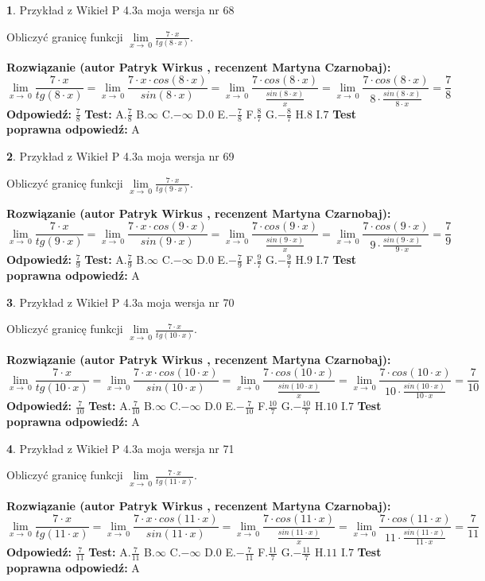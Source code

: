 \documentclass[12pt, a4paper]{article}
\theoremstyle{definition} %
\newtheorem{zad}{}
\newcommand{\zadStart}[1]{\begin{zad}#1\newline}
\newcommand{\zadStop}{\end{zad}}
\newcommand{\rozwStart}[2]{\noindent \textbf{Rozwiązanie (autor #1 , recenzent #2): }\newline}
\newcommand{\rozwStop}{\newline}
\newcommand{\odpStart}{\noindent \textbf{Odpowiedź:}\newline}
\newcommand{\odpStop}{\newline}
\newcommand{\testStart}{\noindent \textbf{Test:}\newline}
\newcommand{\testStop}{\newline}
\newcommand{\kluczStart}{\noindent \textbf{Test poprawna odpowiedź:}\newline}
\newcommand{\kluczStop}{\newline}
\begin{document}
\zadStart{Przykład z Wikieł P 4.3a moja wersja nr 68}


Obliczyć granicę funkcji $\lim\limits_{x\to\ 0}\frac{7 \cdot x}{tg(8 \cdot x)}$.
\zadStop
\rozwStart{Patryk Wirkus}{Martyna Czarnobaj}
$$\lim\limits_{x\to\ 0}\frac{7 \cdot x}{tg(8 \cdot x)}=\lim\limits_{x\to\ 0}\frac{7 \cdot x \cdot cos(8 \cdot x)}{sin(8 \cdot x)}=\lim\limits_{x\to\ 0}\frac{7 \cdot cos(8 \cdot x)}{\frac{sin(8 \cdot x)}{x}}=\lim\limits_{x\to\ 0}\frac{7 \cdot cos(8 \cdot x)}{8 \cdot \frac{sin(8 \cdot x)}{8 \cdot x}} = \frac{7}{8}$$
\rozwStop
\odpStart
$\frac{7}{8}$
\odpStop
\testStart
A.$\frac{7}{8}$
B.$\infty$
C.$-\infty$
D.$0$
E.$-\frac{7}{8}$
F.$\frac{8}{7}$
G.$-\frac{8}{7}$
H.$8$
I.$7$
\testStop
\kluczStart
A
\kluczStop



\zadStart{Przykład z Wikieł P 4.3a moja wersja nr 69}


Obliczyć granicę funkcji $\lim\limits_{x\to\ 0}\frac{7 \cdot x}{tg(9 \cdot x)}$.
\zadStop
\rozwStart{Patryk Wirkus}{Martyna Czarnobaj}
$$\lim\limits_{x\to\ 0}\frac{7 \cdot x}{tg(9 \cdot x)}=\lim\limits_{x\to\ 0}\frac{7 \cdot x \cdot cos(9 \cdot x)}{sin(9 \cdot x)}=\lim\limits_{x\to\ 0}\frac{7 \cdot cos(9 \cdot x)}{\frac{sin(9 \cdot x)}{x}}=\lim\limits_{x\to\ 0}\frac{7 \cdot cos(9 \cdot x)}{9 \cdot \frac{sin(9 \cdot x)}{9 \cdot x}} = \frac{7}{9}$$
\rozwStop
\odpStart
$\frac{7}{9}$
\odpStop
\testStart
A.$\frac{7}{9}$
B.$\infty$
C.$-\infty$
D.$0$
E.$-\frac{7}{9}$
F.$\frac{9}{7}$
G.$-\frac{9}{7}$
H.$9$
I.$7$
\testStop
\kluczStart
A
\kluczStop



\zadStart{Przykład z Wikieł P 4.3a moja wersja nr 70}


Obliczyć granicę funkcji $\lim\limits_{x\to\ 0}\frac{7 \cdot x}{tg(10 \cdot x)}$.
\zadStop
\rozwStart{Patryk Wirkus}{Martyna Czarnobaj}
$$\lim\limits_{x\to\ 0}\frac{7 \cdot x}{tg(10 \cdot x)}=\lim\limits_{x\to\ 0}\frac{7 \cdot x \cdot cos(10 \cdot x)}{sin(10 \cdot x)}=\lim\limits_{x\to\ 0}\frac{7 \cdot cos(10 \cdot x)}{\frac{sin(10 \cdot x)}{x}}=\lim\limits_{x\to\ 0}\frac{7 \cdot cos(10 \cdot x)}{10 \cdot \frac{sin(10 \cdot x)}{10 \cdot x}} = \frac{7}{10}$$
\rozwStop
\odpStart
$\frac{7}{10}$
\odpStop
\testStart
A.$\frac{7}{10}$
B.$\infty$
C.$-\infty$
D.$0$
E.$-\frac{7}{10}$
F.$\frac{10}{7}$
G.$-\frac{10}{7}$
H.$10$
I.$7$
\testStop
\kluczStart
A
\kluczStop



\zadStart{Przykład z Wikieł P 4.3a moja wersja nr 71}


Obliczyć granicę funkcji $\lim\limits_{x\to\ 0}\frac{7 \cdot x}{tg(11 \cdot x)}$.
\zadStop
\rozwStart{Patryk Wirkus}{Martyna Czarnobaj}
$$\lim\limits_{x\to\ 0}\frac{7 \cdot x}{tg(11 \cdot x)}=\lim\limits_{x\to\ 0}\frac{7 \cdot x \cdot cos(11 \cdot x)}{sin(11 \cdot x)}=\lim\limits_{x\to\ 0}\frac{7 \cdot cos(11 \cdot x)}{\frac{sin(11 \cdot x)}{x}}=\lim\limits_{x\to\ 0}\frac{7 \cdot cos(11 \cdot x)}{11 \cdot \frac{sin(11 \cdot x)}{11 \cdot x}} = \frac{7}{11}$$
\rozwStop
\odpStart
$\frac{7}{11}$
\odpStop
\testStart
A.$\frac{7}{11}$
B.$\infty$
C.$-\infty$
D.$0$
E.$-\frac{7}{11}$
F.$\frac{11}{7}$
G.$-\frac{11}{7}$
H.$11$
I.$7$
\testStop
\kluczStart
A
\kluczStop
\end{document}
